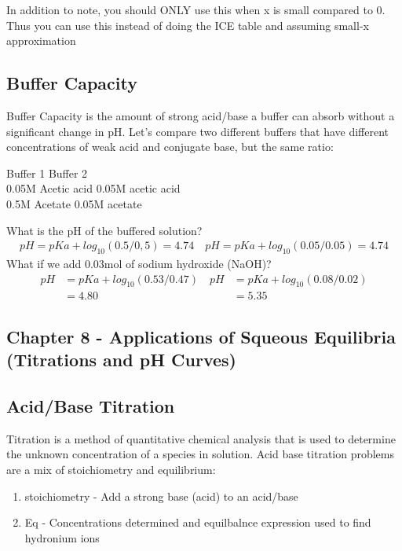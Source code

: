 \documentclass{article}  %
\begin{document}
In addition to note, you should ONLY use this when x is small compared to 0. Thus you can use this instead of doing the ICE table and assuming small-x approximation

\subsection*{Buffer Capacity}
Buffer Capacity is the amount of strong acid/base a buffer can absorb without a significant change in pH. 
\newline
Let's compare two different buffers that have different concentrations of weak acid and conjugate base, but the same ratio:
\begin{center}
    Buffer 1 \quad Buffer 2 \\
    0.05M Acetic acid \quad 0.05M acetic acid \\
    0.5M Acetate \quad 0.05M acetate
\end{center}
What is the pH of the buffered solution?
\begin{equation*}
    \begin{aligned}
        pH  = pKa + log_{10}(0.5/0,5) = 4.74 \quad pH  = pKa + log_{10}(0.05/0.05) = 4.74
    \end{aligned}
\end{equation*}
What if we add 0.03mol of sodium hydroxide (NaOH)?
\begin{equation*}
    \begin{aligned}
        pH  &= pKa + log_{10}(0.53/0.47) \quad pH  &= pKa + log_{10}(0.08/0.02) \\
        &= 4.80 \quad &= 5.35
    \end{aligned}
\end{equation*} %

\subsection*{Chapter 8 - Applications of Squeous Equilibria (Titrations and pH Curves)}

\subsection*{Acid/Base Titration}
Titration is a method of quantitative chemical analysis that is used to determine the unknown concentration of a species in solution. 
\newline
Acid base titration problems are a mix of stoichiometry and equilibrium:
\begin{enumerate}
    \item stoichiometry - Add a strong base (acid) to an acid/base
    \item Eq - Concentrations determined and equilbalnce expression used to find hydronium ions
\end{enumerate}
\end{document}
